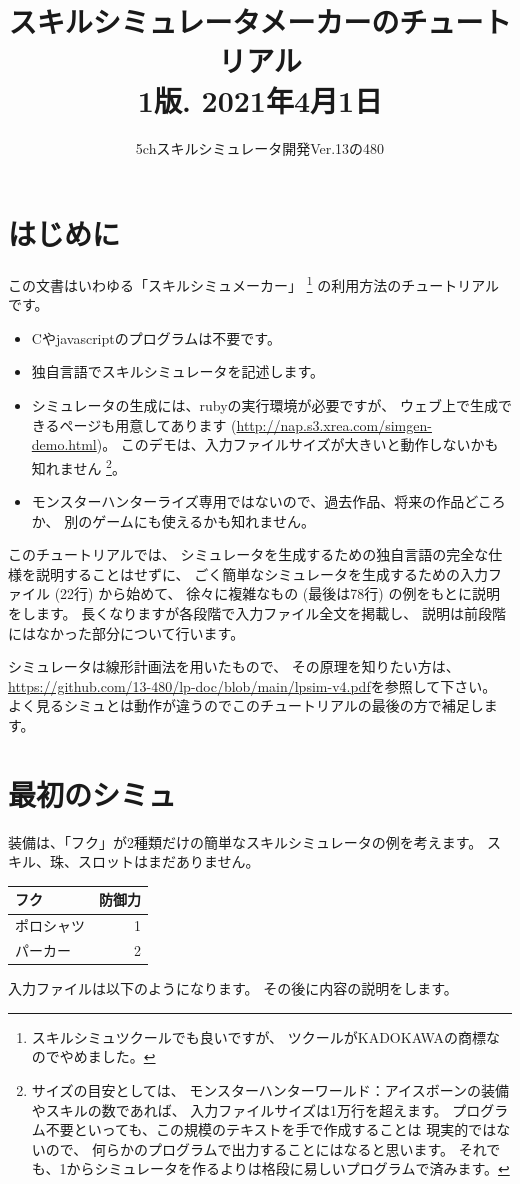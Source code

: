 \documentclass[dvipdfmx]{jsarticle}
\title{スキルシミュレータメーカーのチュートリアル
\\
{\small 1版. 2021年4月1日}
}
\date{}
\author{5chスキルシミュレータ開発Ver.13の480}
\begin{document}
\maketitle
\tableofcontents

\section{はじめに} %
この文書はいわゆる「スキルシミュメーカー」%
\footnote{スキルシミュツクールでも良いですが、
ツクールがKADOKAWAの商標なのでやめました。}%
の利用方法のチュートリアルです。

\begin{itemize}
\item 
Cやjavascriptのプログラムは不要です。
\item 
独自言語でスキルシミュレータを記述します。
\item 
シミュレータの生成には、rubyの実行環境が必要ですが、
ウェブ上で生成できるページも用意してあります
(\url{http://nap.s3.xrea.com/simgen-demo.html})。
このデモは、入力ファイルサイズが大きいと動作しないかも知れません%
\footnote{%
サイズの目安としては、
モンスターハンターワールド：アイスボーンの装備やスキルの数であれば、
入力ファイルサイズは1万行を超えます。
プログラム不要といっても、この規模のテキストを手で作成することは
現実的ではないので、
何らかのプログラムで出力することにはなると思います。
それでも、1からシミュレータを作るよりは格段に易しいプログラムで済みます。
}。
\item 
モンスターハンターライズ専用ではないので、過去作品、将来の作品どころか、
別のゲームにも使えるかも知れません。
\end{itemize}

このチュートリアルでは、
シミュレータを生成するための独自言語の完全な仕様を説明することはせずに、
ごく簡単なシミュレータを生成するための入力ファイル (22行) から始めて、
徐々に複雑なもの (最後は78行) の例をもとに説明をします。
長くなりますが各段階で入力ファイル全文を掲載し、
説明は前段階にはなかった部分について行います。

シミュレータは線形計画法を用いたもので、
その原理を知りたい方は、
\url{https://github.com/13-480/lp-doc/blob/main/lpsim-v4.pdf}を参照して下さい。
よく見るシミュとは動作が違うのでこのチュートリアルの最後の方で補足します。

\section{最初のシミュ} %
装備は、「フク」が2種類だけの簡単なスキルシミュレータの例を考えます。
スキル、珠、スロットはまだありません。
%
\begin{center}
\begin{tabular}{lr}
\toprule
フク       & 防御力 \\
\midrule
ポロシャツ & 1 \\
パーカー   & 2 \\
\bottomrule
\end{tabular}
\end{center}
%
入力ファイルは以下のようになります。
その後に内容の説明をします。
\medskip
\end{document}
